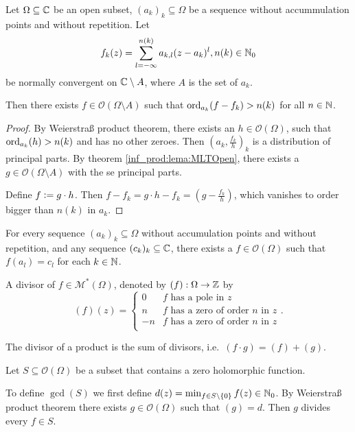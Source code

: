 \begin{izrek}
    Let $\Omega \subseteq \mathbb{C}$ be an open subset, $(a_k)_k \subseteq \Omega$ be a sequence without accummulation points and without repetition. Let 
    $$
        f_k(z) = \sum_{l = -\infty}^{n(k)} a_{k, l}(z - a_k)^l, n(k) \in \mathbb{N}_0
    $$
    be normally convergent on $\mathbb{C} \setminus A$, where $A$ is the set of $a_k$.

    Then there exists $f \in \mathcal{O}(\Omega \setminus A)$ such that $\operatorname{ord}_{a_k}(f - f_k) > n(k)$ for all $n \in \mathbb{N}$.
\end{izrek}
\begin{proof}
    By Weierstraß product theorem, there exists an $h \in \mathcal{O}(\Omega)$, such that $\operatorname{ord}_{a_k}(h) > n(k)$ and has no other zeroes. Then $(a_k, \frac{f_k}{h})_k$ is a distribution of principal parts. By theorem \ref{inf_prod:lema:MLTOpen}, there exists a $g \in \mathcal{O}(\Omega \setminus A)$ with the se principal parts.

    Define $f \vcentcolon= g \cdot h$. Then $f - f_k = g \cdot h - f_k = (g - \frac{f_k}{h})$, which vanishes to order bigger than $n(k)$ in $a_k$.
\end{proof}
\begin{posledica}
    For every sequence $(a_k)_k \subseteq \Omega$ without accumulation points and without repetition, and any sequence $(c_k)_k \subseteq \mathbb{C}$, there exists a $f \in \mathcal{O}(\Omega)$ such that $f(a_l) = c_l$ for each $k \in \mathbb{N}$.
\end{posledica}

\begin{definicija}
    A divisor of $f \in \mathcal{M}^*(\Omega)$, denoted by $(f) : \Omega \rightarrow \mathbb{Z}$ by 
    $$
        (f)(z) = \begin{cases}
            0 & \text{$f$ has a pole in $z$} \\
            n & \text{$f$ has a zero of order $n$ in $z$} \\
            -n & \text{$f$ has a zero of order $n$ in $z$} \\
        \end{cases}.
    $$
\end{definicija}
\begin{opomba}
    The divisor of a product is the sum of divisors, i.e.\ $(f \cdot g) = (f) + (g)$.
\end{opomba}

\begin{definicija}
    Let $S \subseteq \mathcal{O}(\Omega)$ be a subset that contains a zero holomorphic function.

    To define $\gcd(S)$ we first define $d(z) = \min_{f \in S \setminus \left\{0\right\}} f(z) \in \mathbb{N}_0$. By Weierstraß product theorem there exists $g \in \mathcal{O}(\Omega)$ such that $(g) = d$. Then $g$ divides every $f \in S$.
\end{definicija}